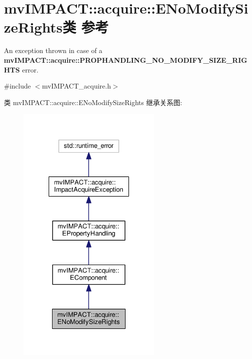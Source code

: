 \hypertarget{classmv_i_m_p_a_c_t_1_1acquire_1_1_e_no_modify_size_rights}{\section{mv\+I\+M\+P\+A\+C\+T\+:\+:acquire\+:\+:E\+No\+Modify\+Size\+Rights类 参考}
\label{classmv_i_m_p_a_c_t_1_1acquire_1_1_e_no_modify_size_rights}
}


An exception thrown in case of a {\bfseries mv\+I\+M\+P\+A\+C\+T\+::acquire\+::\+P\+R\+O\+P\+H\+A\+N\+D\+L\+I\+N\+G\+\_\+\+N\+O\+\_\+\+M\+O\+D\+I\+F\+Y\+\_\+\+S\+I\+Z\+E\+\_\+\+R\+I\+G\+H\+T\+S} error.  




{\ttfamily \#include $<$mv\+I\+M\+P\+A\+C\+T\+\_\+acquire.\+h$>$}



类 mv\+I\+M\+P\+A\+C\+T\+:\+:acquire\+:\+:E\+No\+Modify\+Size\+Rights 继承关系图\+:
\nopagebreak
\begin{figure}[H]
\begin{center}
\leavevmode
\includegraphics[width=202pt]{classmv_i_m_p_a_c_t_1_1acquire_1_1_e_no_modify_size_rights__inherit__graph}
\end{center}
\end{figure}


